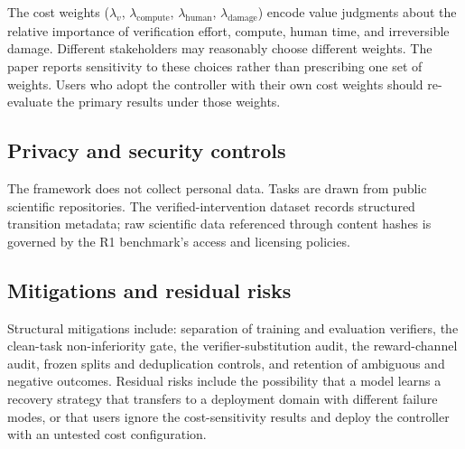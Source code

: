 The cost weights ($\lambda_v$, $\lambda_{\text{compute}}$,
$\lambda_{\text{human}}$, $\lambda_{\text{damage}}$) encode value judgments
about the relative importance of verification effort, compute, human time,
and irreversible damage. Different stakeholders may reasonably choose
different weights. The paper reports sensitivity to these choices rather
than prescribing one set of weights. Users who adopt the controller with
their own cost weights should re-evaluate the primary results under those
weights.

\subsection{Privacy and security controls}

The framework does not collect personal data. Tasks are drawn from public
scientific repositories. The verified-intervention dataset records
structured transition metadata; raw scientific data referenced through
content hashes is governed by the R1 benchmark's access and licensing
policies.

\subsection{Mitigations and residual risks}

Structural mitigations include: separation of training and evaluation
verifiers, the clean-task non-inferiority gate, the verifier-substitution
audit, the reward-channel audit, frozen splits and deduplication controls,
and retention of ambiguous and negative outcomes. Residual risks include
the possibility that a model learns a recovery strategy that transfers to a
deployment domain with different failure modes, or that users ignore the
cost-sensitivity results and deploy the controller with an untested cost
configuration.
